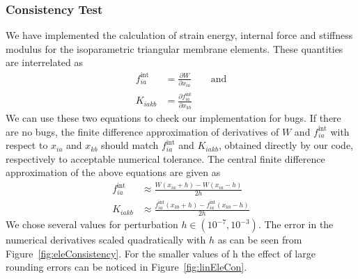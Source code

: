 \documentclass[../main.tex]{subfiles}
\begin{document}
\subsubsection{Consistency Test}
We have implemented the calculation of strain energy, internal force
and stiffness modulus for the isoparametric triangular membrane
elements. These quantities are interrelated as
\begin{align*}
  f^{\text{int}}_{ia} &= \frac{\partial W}{\partial x_{ia}} \qquad \text{and}\\[5pt]
  K_{iakb} &= \frac{\partial f^{\text{int}}_{ia}}{\partial x_{kb}}
\end{align*}
We can use these two equations to check our implementation for
bugs. If there are no bugs, the finite difference approximation of
derivatives of $W$ and $f^{\text{int}}_{ia}$ with respect to $x_{ia}$
and $x_{kb}$ should match $f^{\text{int}}_{ia}$ and $K_{iakb}$,
obtained directly by our code, respectively to acceptable numerical
tolerance. The central finite difference approximation of the above
equations are given as
\begin{align*}
  f^{\text{int}}_{ia} &\approx \frac{W(x_{ia}+h) - W(x_{ia}-h)}{2h} \\[5pt]
  K_{iakb} &\approx \frac{f^{\text{int}}_{ia}(x_{kb}+h)-f^{\text{int}}_{ia}(x_{kb}-h)}{2h}
\end{align*}
We chose several values for perturbation $h \in (10^{-7},10^{-3})$.
The error in the numerical derivatives scaled quadratically with $h$
as can be seen from Figure~\ref{fig:eleConsistency}. For the smaller
values of h the effect of large rounding errors can be noticed in
Figure~\ref{fig:linEleCon}.
\end{document}
